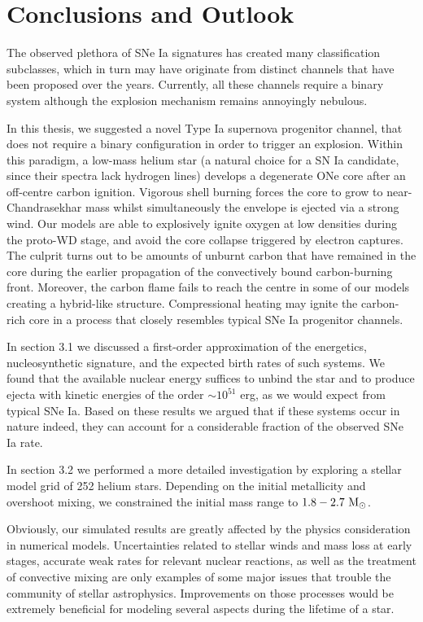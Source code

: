 \documentclass[../../main/thesis_msc.tex]{subfiles}
\begin{document}
	\chapter{Conclusions and Outlook}
	
		The observed plethora of SNe Ia signatures has created many classification subclasses, which in turn may have originate from distinct channels that have been proposed over the years. Currently, all these channels require a binary system although the explosion mechanism remains annoyingly nebulous. 


		In this thesis, we suggested a novel Type Ia supernova progenitor channel, that does not require a binary configuration in order to trigger an explosion. Within this paradigm, a low-mass helium star (a natural choice for a SN Ia candidate, since their spectra lack hydrogen lines) develops a degenerate ONe core after an off-centre carbon ignition. Vigorous shell burning forces the core to grow to near-Chandrasekhar mass whilst simultaneously the envelope is ejected via a strong wind. Our models are able to explosively ignite oxygen at low densities during the proto-WD stage, and avoid the core collapse triggered by electron captures. The culprit turns out to be amounts of unburnt carbon that have remained in the core during the earlier propagation of the convectively bound carbon-burning front.
		Moreover, the carbon flame fails to reach the centre in some of our models creating a hybrid-like structure. Compressional heating may ignite the carbon-rich core in a process that closely resembles typical SNe Ia progenitor channels.
		
		
		In section 3.1 we discussed a first-order approximation of the energetics, nucleosynthetic signature, and the expected birth rates of such systems. We found that the available nuclear energy suffices to unbind the star and to produce ejecta with kinetic energies of the order $\sim 10^{51}$ erg, as we would expect from typical SNe Ia. Based on these results we argued that if these systems occur in nature indeed, they can account for a considerable fraction of the observed SNe Ia rate.
		
		In section 3.2 we performed a more detailed investigation by exploring a stellar model grid of 252 helium stars. Depending on the initial metallicity and overshoot mixing, we constrained the initial mass range to $\rm 1.8 - 2.7 \ M_{\odot}$.
		
		
		Obviously, our simulated results are greatly affected by the physics consideration in numerical models. Uncertainties related to stellar winds and mass loss at early stages, accurate weak rates for relevant nuclear reactions, as well as the treatment of convective mixing are only examples of some major issues that trouble the community of stellar astrophysics. Improvements on those processes would be extremely beneficial for modeling several aspects during the lifetime of a star.
		
\end{document}
